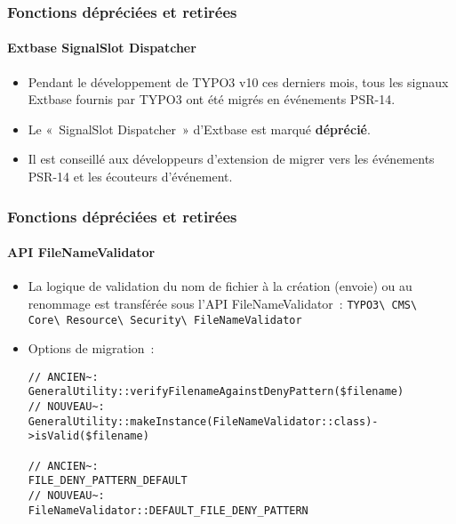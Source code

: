 \begin{frame}[fragile]
	\frametitle{Fonctions dépréciées et retirées}
	\framesubtitle{Extbase SignalSlot Dispatcher}

	\begin{itemize}
		\item Pendant le développement de TYPO3 v10 ces derniers mois,
			tous les signaux Extbase fournis par TYPO3 ont été migrés en événements PSR-14.
		\item Le «~SignalSlot Dispatcher~» d'Extbase est marqué \textbf{déprécié}.
		\item Il est conseillé aux développeurs d'extension de migrer vers les événements PSR-14
			et les écouteurs d'événement.
	\end{itemize}

\end{frame}


\begin{frame}[fragile]
	\frametitle{Fonctions dépréciées et retirées}
	\framesubtitle{API FileNameValidator}

	\lstset{basicstyle=\tiny\ttfamily}

	\begin{itemize}
		\item La logique de validation du nom de fichier à la création (envoie) ou
			au renommage est transférée sous l'API FileNameValidator~:
			\small
				\texttt{TYPO3\textbackslash
					CMS\textbackslash
					Core\textbackslash
					Resource\textbackslash
					Security\textbackslash
					FileNameValidator}
			\normalsize

		\item Options de migration~:

\begin{lstlisting}
// ANCIEN~:
GeneralUtility::verifyFilenameAgainstDenyPattern($filename)
// NOUVEAU~:
GeneralUtility::makeInstance(FileNameValidator::class)->isValid($filename)

// ANCIEN~:
FILE_DENY_PATTERN_DEFAULT
// NOUVEAU~:
FileNameValidator::DEFAULT_FILE_DENY_PATTERN
\end{lstlisting}

	\end{itemize}

\end{frame}


